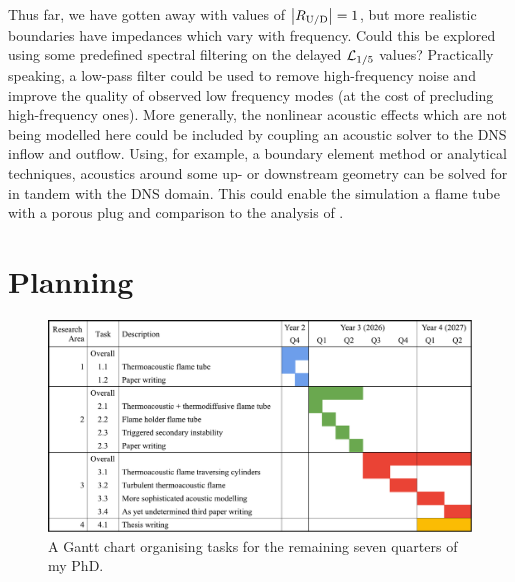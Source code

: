 Thus far, we have gotten away with values of $\abs{R_{\mathrm{U}/\mathrm{D}}} = 1$, but more realistic boundaries have impedances which vary with frequency. Could this be explored using some predefined spectral filtering on the delayed $\mathcal{L}_{1/5}$ values? Practically speaking, a low-pass filter could be used to remove high-frequency noise and improve the quality of observed low frequency modes (at the cost of precluding high-frequency ones). More generally, the nonlinear acoustic effects which are not being modelled here could be included by coupling an acoustic solver to the DNS inflow and outflow. Using, for example, a boundary element method or analytical techniques, acoustics around some up- or downstream geometry can be solved for in tandem with the DNS domain. This could enable the simulation a flame tube with a porous plug and comparison to the analysis of \cite{gaton-perez2025MitigationThermoacousticInstabilities}.



\section{Planning}

\begin{figure}[t]
\centering
\includegraphics[scale=0.5]{assets/graphs/2YR_Gantt.pdf}
\caption{A Gantt chart organising tasks for the remaining seven quarters of my PhD.}
\label{fig:gantt}
\end{figure}

